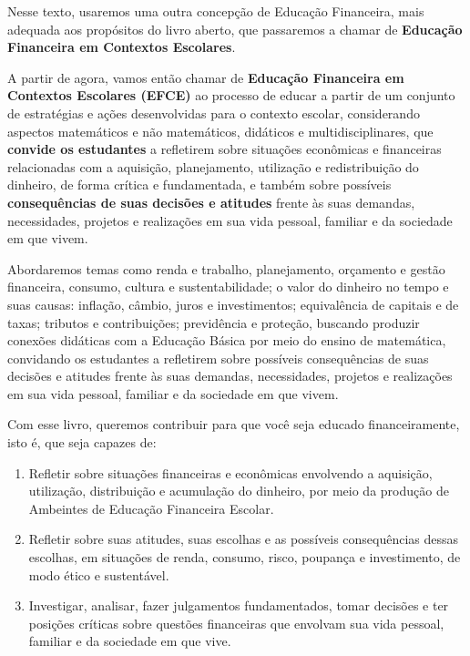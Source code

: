 Nesse texto, usaremos uma outra concepção de Educação Financeira, mais adequada aos propósitos do livro aberto, que passaremos a chamar de \textbf{Educação Financeira em Contextos Escolares}.

A partir de agora, vamos então chamar de \textbf{Educação Financeira em Contextos Escolares (EFCE)} ao processo de educar a partir de um conjunto de estratégias e ações desenvolvidas para o contexto escolar, considerando aspectos matemáticos e não matemáticos, didáticos e multidisciplinares, que \textbf{convide os estudantes} a refletirem sobre situações econômicas e financeiras relacionadas com a aquisição, planejamento, utilização e redistribuição do dinheiro, de forma crítica e fundamentada, e também sobre possíveis \textbf{consequências de suas decisões e atitudes} frente às suas demandas, necessidades, projetos e realizações em sua vida pessoal, familiar e da sociedade em que vivem.

Abordaremos temas como renda e trabalho, planejamento, orçamento e gestão financeira, consumo, cultura e sustentabilidade; o valor do dinheiro no tempo e suas causas: inflação, câmbio, juros e investimentos; equivalência de capitais e de taxas; tributos e contribuições; previdência e proteção, buscando produzir conexões didáticas com a Educação Básica por meio do ensino de matemática, convidando os estudantes a refletirem sobre possíveis consequências de suas decisões e atitudes frente às suas demandas, necessidades, projetos e realizações em sua vida pessoal, familiar e da sociedade em que vivem.

Com esse livro, queremos contribuir para que você seja educado financeiramente, isto é, que seja capazes de:

\begin{enumerate}[label=\arabic*.]

\item Refletir sobre situações financeiras e econômicas envolvendo a aquisição, utilização, distribuição e acumulação do dinheiro, por meio da produção de Ambeintes de Educação Financeira Escolar.

\item Refletir sobre suas atitudes, suas escolhas e as possíveis consequências dessas escolhas, em situações de renda, consumo, risco, poupança e investimento, de modo ético e sustentável. 

\item Investigar, analisar, fazer julgamentos fundamentados, tomar decisões e ter posições críticas sobre questões financeiras que envolvam sua vida pessoal, familiar e da sociedade em que vive.

\end{enumerate}

